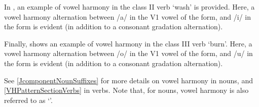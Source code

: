 In , an example of vowel harmony in the class II verb  ‘wash’ is provided. Here, a vowel harmony alternation between /a/ in the V1 vowel of the  form, and /i/ in the  form is evident (in addition to a consonant gradation alternation). 
\ea\label{vhEx2}%
\z

Finally,  shows an example of vowel harmony in the class III verb  ‘burn’. Here, a vowel harmony alternation between /o/ in the V1 vowel of the  form, and /u/ in the  form is evident (in addition to a consonant gradation alternation). 
\ea\label{vhEx3}%
\z


See \SEC\ref{JcomponentNounSuffixes} for more details on vowel harmony in nouns, and \SEC\ref{VHPatternSectionVerbs} in verbs. Note that, for nouns, vowel harmony is also referred to as ‘\jvh’.

\FB



